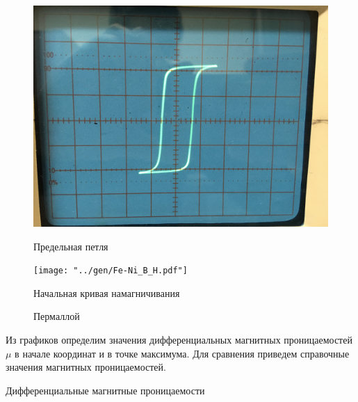 \begin{figure}[H]
	\centering
	\begin{minipage}[c]{.43\textwidth}
		\centering
		\includegraphics[width=0.9\linewidth]{"../photos/fe_ni.jpg"}
		\caption*{Предельная петля}
	\end{minipage}%
	\begin{minipage}[c]{.57\textwidth}
		\centering
		\texttt{[image: "../gen/Fe-Ni\_B\_H.pdf"]}
		\vspace{-10pt}
		\caption*{Начальная кривая намагничивания}
	\end{minipage}
	\caption{Пермаллой}
	\label{img:feni}
\end{figure}

Из графиков определим значения дифференциальных магнитных проницаемостей $\mu$ в начале координат и в точке максимума. Для сравнения приведем справочные значения магнитных проницаемостей.

\begin{table}[H]
	\centering
	\footnotesize
	
	\caption{Дифференциальные магнитные проницаемости}
	\label{tab:diff}
\end{table}
